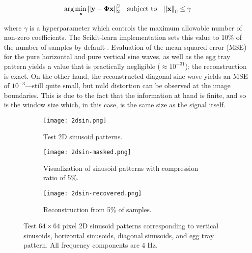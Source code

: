 \begin{equation}\label{eq:omp}
	\arg\min_{\text{\bfseries x}} \norm{\text{\bfseries y} - \bm\Phi \text{\bfseries x}}_2^2 \quad \textrm{subject to} \quad \norm{\text{\bfseries x}}_0 \leq \gamma
\end{equation}

\noindent where $\gamma$ is a hyperparameter which controls the maximum allowable number of non-zero coefficients. The Scikit-learn implementation sets this value to 10\% of the number of samples by default \cite{scikit-learn}. Evaluation of the mean-squared error (MSE) for the pure horizontal and pure vertical sine waves, as well as the egg tray pattern yields a value that is practically negligible ($\approx 10^{-31}$); the reconstruction is exact. On the other hand, the reconstructed diagonal sine wave yields an MSE of $10^{-3}$---still quite small, but mild distortion can be observed at the image boundaries. This is due to the fact that the information at hand is finite, and so is the window size which, in this case, is the same size as the signal itself.

\begin{figure}[htb]
	\centering
	\begin{subfigure}{\textwidth}
		\centering
		\texttt{[image: 2dsin.png]}
		\caption{Test 2D sinusoid patterns.}
		\label{fig:2dsin}
	\end{subfigure}
	\begin{subfigure}{\textwidth}
		\centering
		\texttt{[image: 2dsin-masked.png]}
		\caption{Visualization of sinusoid patterns with compression ratio of 5\%.}
		\label{fig:2dsin-masked}
	\end{subfigure}
	\begin{subfigure}{\textwidth}
		\centering
		\texttt{[image: 2dsin-recovered.png]}
		\caption{Reconstruction from 5\% of samples.}
		\label{fig:2dsin-recovered}
	\end{subfigure}
	\caption{Test $64 \times 64$ pixel 2D sinusoid patterns corresponding to vertical sinusoids, horizontal sinusoids, diagonal sinusoids, and egg tray pattern. All frequency components are 4 Hz.}
	\label{fig:test-2dsin}
\end{figure}


